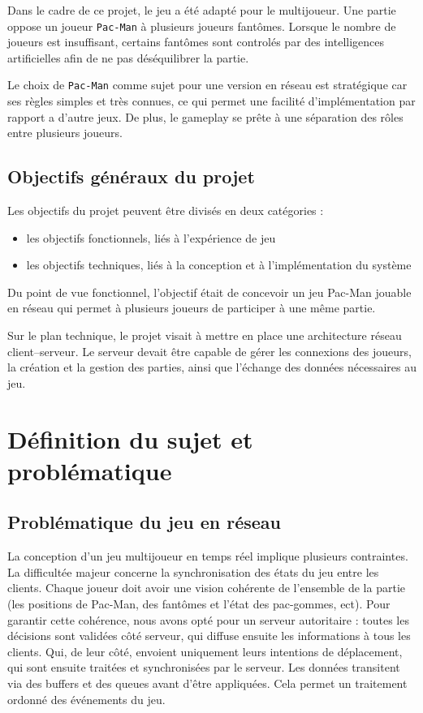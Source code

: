 \documentclass[a4paper, 11pt]{report}
\begin{document}
Dans le cadre de ce projet, le jeu a été adapté pour le multijoueur. Une partie oppose un joueur \texttt{Pac-Man} à plusieurs joueurs fantômes. Lorsque le nombre de joueurs est insuffisant, certains fantômes sont controlés par des intelligences artificielles afin de ne pas déséquilibrer la partie.

Le choix de \texttt{Pac-Man} comme sujet pour une version en réseau est stratégique car ses règles simples et très connues, ce qui permet une facilité d'implémentation par rapport a d'autre jeux. De plus, le gameplay se prête à une séparation des rôles entre plusieurs joueurs.

\section{Objectifs généraux du projet}

Les objectifs du projet peuvent être divisés en deux catégories : 
\begin{itemize}
    \item les objectifs fonctionnels, liés à l’expérience de jeu
    \item les objectifs techniques, liés à la conception et à l’implémentation du système\\
\end{itemize}


Du point de vue fonctionnel, l’objectif était de concevoir un jeu Pac-Man jouable en réseau qui permet à plusieurs joueurs de participer à une même partie.

Sur le plan technique, le projet visait à mettre en place une architecture réseau client–serveur. Le serveur devait être capable de gérer les connexions des joueurs, la création et la gestion des parties, ainsi que l’échange des données nécessaires au jeu.

\chapter{Définition du sujet et problématique}

\section{Problématique du jeu en réseau}

La conception d’un jeu multijoueur en temps réel implique plusieurs contraintes. La difficultée majeur concerne la synchronisation des états du jeu entre les clients. Chaque joueur doit avoir une vision cohérente de l’ensemble de la partie (les positions de Pac-Man, des fantômes et l’état des pac-gommes, ect). Pour garantir cette cohérence, nous avons opté pour un serveur autoritaire : toutes les décisions sont validées côté serveur, qui diffuse ensuite les informations à tous les clients. Qui, de leur côté, envoient uniquement leurs intentions de déplacement, qui sont ensuite traitées et synchronisées par le serveur. Les données transitent via des buffers et des queues avant d’être appliquées. Cela permet un traitement ordonné des événements du jeu.
\end{document}
